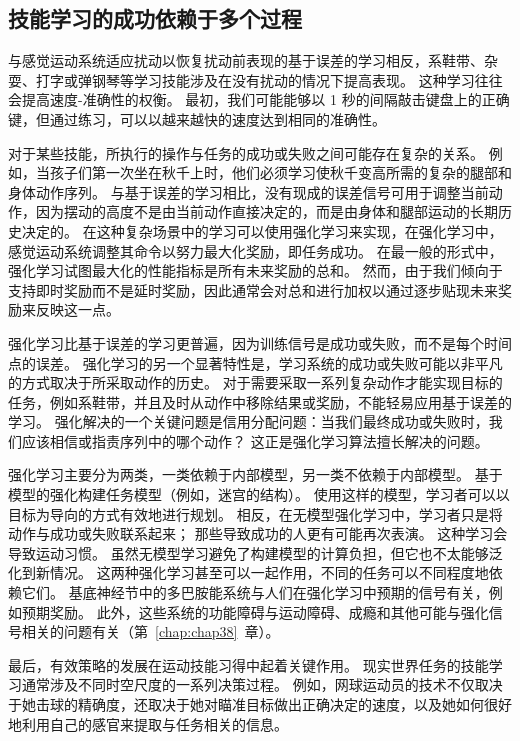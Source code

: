 \subsection{技能学习的成功依赖于多个过程}

与感觉运动系统适应扰动以恢复扰动前表现的基于误差的学习相反，系鞋带、杂耍、打字或弹钢琴等学习技能涉及在没有扰动的情况下提高表现。
这种学习往往会提高速度-准确性的权衡。
最初，我们可能能够以 1 秒的间隔敲击键盘上的正确键，但通过练习，可以以越来越快的速度达到相同的准确性。


对于某些技能，所执行的操作与任务的成功或失败之间可能存在复杂的关系。
例如，当孩子们第一次坐在秋千上时，他们必须学习使秋千变高所需的复杂的腿部和身体动作序列。
与基于误差的学习相比，没有现成的误差信号可用于调整当前动作，因为摆动的高度不是由当前动作直接决定的，而是由身体和腿部运动的长期历史决定的。
在这种复杂场景中的学习可以使用强化学习来实现，在强化学习中，感觉运动系统调整其命令以努力最大化奖励，即任务成功。
在最一般的形式中，强化学习试图最大化的性能指标是所有未来奖励的总和。
然而，由于我们倾向于支持即时奖励而不是延时奖励，因此通常会对总和进行加权以通过逐步贴现未来奖励来反映这一点。


强化学习比基于误差的学习更普遍，因为训练信号是成功或失败，而不是每个时间点的误差。
强化学习的另一个显著特性是，学习系统的成功或失败可能以非平凡的方式取决于所采取动作的历史。
对于需要采取一系列复杂动作才能实现目标的任务，例如系鞋带，并且及时从动作中移除结果或奖励，不能轻易应用基于误差的学习。
强化解决的一个关键问题是信用分配问题：当我们最终成功或失败时，我们应该相信或指责序列中的哪个动作？
这正是强化学习算法擅长解决的问题。


强化学习主要分为两类，一类依赖于内部模型，另一类不依赖于内部模型。
基于模型的强化构建任务模型（例如，迷宫的结构）。
使用这样的模型，学习者可以以目标为导向的方式有效地进行规划。
相反，在无模型强化学习中，学习者只是将动作与成功或失败联系起来；
那些导致成功的人更有可能再次表演。
这种学习会导致运动习惯。
虽然无模型学习避免了构建模型的计算负担，但它也不太能够泛化到新情况。
这两种强化学习甚至可以一起作用，不同的任务可以不同程度地依赖它们。
基底神经节中的多巴胺能系统与人们在强化学习中预期的信号有关，例如预期奖励。
此外，这些系统的功能障碍与运动障碍、成瘾和其他可能与强化信号相关的问题有关（第~\ref{chap:chap38}~章）。


最后，有效策略的发展在运动技能习得中起着关键作用。
现实世界任务的技能学习通常涉及不同时空尺度的一系列决策过程。
例如，网球运动员的技术不仅取决于她击球的精确度，还取决于她对瞄准目标做出正确决定的速度，以及她如何很好地利用自己的感官来提取与任务相关的信息。



